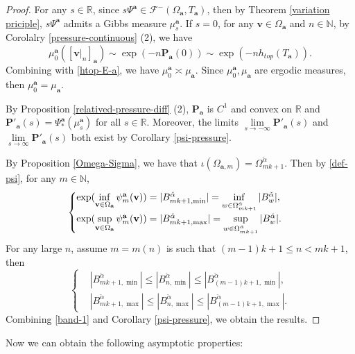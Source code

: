 \documentclass[reqno,11pt,graphicx,]{amsart}
\numberwithin{equation}{section}
\theoremstyle{plain}
\newcommand{\N}{{\mathbb N}}
\newcommand{\R}{{\mathbb R}}
\newcommand{\p}{\mathbf P}
\newcommand{\3}{\mathbf{3}}
\newcommand{\ma}{\mathbf{a}}
\newcommand{\mv}{\mathbf{v}}
\begin{document}
	\begin{proof}
		For any $s\in\R$, since $s\Psi^{\ma}\in\mathcal{F}^-(\Omega_{\ma},T_{\ma})$, then by Theorem \ref{variation priciple}, $s\Psi^{\ma}$ admits a Gibbs measure $\mu^{\ma}_{s}$. If $s=0$, for any $\mv\in\Omega_{\ma}$ and $n\in\N$, by Corolalry \ref{pressure-continuous} (2), we have
		\begin{equation*}
			\mu^{\ma}_{0}([\mv|_n]_{\ma})\sim\exp(-n\p_{\ma}(0))\sim\exp(-nh_{top}(T_{\ma})).
		\end{equation*}
		Combining with \eqref{htop-E-a}, we have $\mu^{\ma}_{0}\asymp\mu_{\ma}$. Since $\mu^{\ma}_{0},\mu_{\ma}$ are ergodic measures, then $\mu^{\ma}_{0}=\mu_{\ma}$.
		
		By Proposition \ref{relatived-pressure-diff} (2), $\p_{\ma}$ is $C^1$ and convex on $\R$ and $\p'_{\ma}(s)=\Psi^{\ma}_*(\mu^{\ma}_{s})$ for all $s\in\R$. Moreover, the limits $\lim\limits_{s\to-\infty}\p'_{\ma}(s)$ and $ \lim\limits_{s\to\infty}\p'_{\ma}(s)$ both exist by Corollary \ref{psi-pressure}.
		
		By Proposition \ref{Omega-Sigma}, we have that $\iota(\Omega_{\ma,m})=\Omega^{\check{\alpha}}_{mk+1}$. Then by \eqref{def-psi}, for any $m\in\N$, 
		\begin{equation}\label{band-1}
			\begin{cases} 
				\exp(\inf\limits_{\mv\in\Omega_{\ma}}\psi^{\ma}_m(\mv))=|B^{\check{\alpha}}_{mk+1,\min}|=\inf\limits_{w\in\Omega^{\check{\alpha}}_{mk+1}}|B^{\check{\alpha}}_w|,\\ \exp(\sup\limits_{\mv\in\Omega_{\ma}}\psi^{\ma}_m(\mv))=|B^{\check{\alpha}}_{mk+1,\max}|=\sup\limits\limits_{w\in\Omega^{\check{\alpha}}_{mk+1}}|B^{\check{\alpha}}_w|.
			\end{cases}
		\end{equation}
		For any large $n$, assume $m=m(n)$ is such that $(m-1)k+1\leq n< mk+1$, then 
		\begin{equation*}
			\left\{ \begin{aligned}
				&|B^{\check{\alpha}}_{mk+1,\min}|\leq|B^{\check{\alpha}}_{n,\min}|\leq|B^{\check{\alpha}}_{(m-1)k+1,\min}|,\\
				&|B^{\check{\alpha}}_{mk+1,\max}|\leq|B^{\check{\alpha}}_{n,\max}|\leq|B^{\check{\alpha}}_{(m-1)k+1,\max}|.
			\end{aligned}\right.
		\end{equation*}
		Combining \eqref{band-1} and Corollary \ref{psi-pressure}, we obtain the results.
	\end{proof}
	Now we can obtain the following asymptotic properties:
\end{document}
